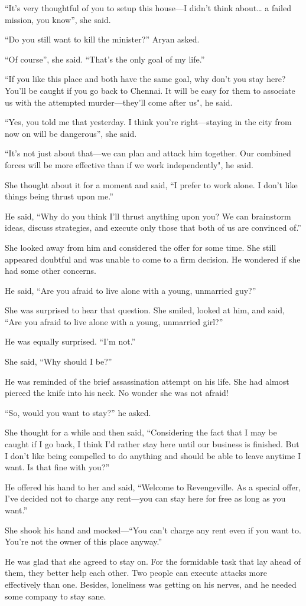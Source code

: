 “It's very thoughtful of you to setup this house—I didn't think about…
a failed mission, you know”, she said.

“Do you still want to kill the minister?” Aryan asked.

“Of course”, she said. “That's the only goal of my life.”

“If you like this place and both have the same goal, why don't you stay
here? You'll be caught if you go back to Chennai. It will be easy for them to
associate us with the attempted murder—they'll come after us", he said.

“Yes, you told me that yesterday. I think you're right—staying in the city
from now on will be dangerous”, she said.

“It's not just about that—we can plan and attack him together. Our combined
forces will be more effective than if we work independently", he said.

She thought about it for a moment and said, “I prefer to work alone. I don't
like things being thrust upon me.”

He said, “Why do you think I'll thrust anything upon you? We can brainstorm
ideas, discuss strategies, and execute only those that both of us are convinced
of.”

She looked away from him and considered the offer for some time. She still
appeared doubtful and was unable to come to a firm decision. He wondered if she
had some other concerns.

He said, “Are you afraid to live alone with a young, unmarried guy?”

She was surprised to hear that question. She smiled, looked at him, and said,
“Are you afraid to live alone with a young, unmarried girl?”

He was equally surprised. “I'm not.”

She said, “Why should I be?”

He was reminded of the brief assassination attempt on his life. She had almost
pierced the knife into his neck. No wonder she was not afraid!

“So, would you want to stay?” he asked.

She thought for a while and then said, “Considering the fact that I may be
caught if I go back, I think I'd rather stay here until our business is
finished. But I don't like being compelled to do anything and should be able
to leave anytime I want. Is that fine with you?”

He offered his hand to her and said, “Welcome to Revengeville. As a special
offer, I've decided not to charge any rent—you can stay here for free as
long as you want.”

She shook his hand and mocked—“You can't charge any rent even if you
want to. You're not the owner of this place anyway.”

He was glad that she agreed to stay on. For the formidable task that lay ahead
of them, they better help each other. Two people can execute attacks
more effectively than one. Besides, loneliness was getting on his
nerves, and he needed some company to stay sane.
